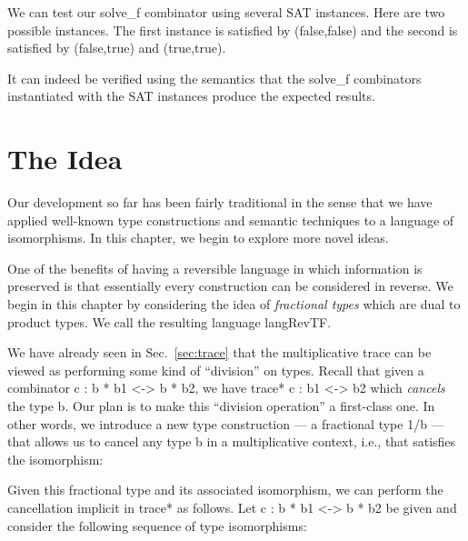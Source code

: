 \documentclass{llncs}
\begin{document}
We can test our {{solve_f}} combinator using several SAT
instances. Here are two possible instances. The first instance is
satisfied by {{(false,false)}} and the
second is satisfied by {{(false,true)}} and {{(true,true)}}.

% 

It can indeed be verified using the semantics that the {{solve_f}}
combinators instantiated with the SAT instances produce the expected
results. 

\section{The Idea}

Our development so far has been fairly traditional in the sense that
we have applied well-known type constructions and semantic techniques
to a language of isomorphisms. In this chapter, we begin to explore
more novel ideas. 

One of the benefits of having a reversible language in which
information is preserved is that essentially every construction can be
considered in reverse. We begin in this chapter by considering the
idea of \emph{fractional types} which are dual to product types. We
call the resulting language {{langRevTF}}.

We have already seen in Sec.~\ref{sec:trace} that the multiplicative
trace can be viewed as performing some kind of ``division'' on
types. Recall that given a combinator {{c : b * b1 <-> b * b2}}, we
have {{trace* c : b1 <-> b2}} which \emph{cancels} the type {{b}}.
Our plan is to make this ``division operation'' a first-class one. In
other words, we introduce a new type construction --- a fractional
type {{1/b}} --- that allows us to cancel any type {{b}} in a
multiplicative context, i.e., that satisfies the isomorphism:


Given this fractional type and its associated isomorphism, we can
perform the cancellation implicit in {{trace*}} as follows. 
Let {{ c :  b * b1 <-> b * b2 }} be given and consider the 
following sequence of type isomorphisms:
\end{document}
